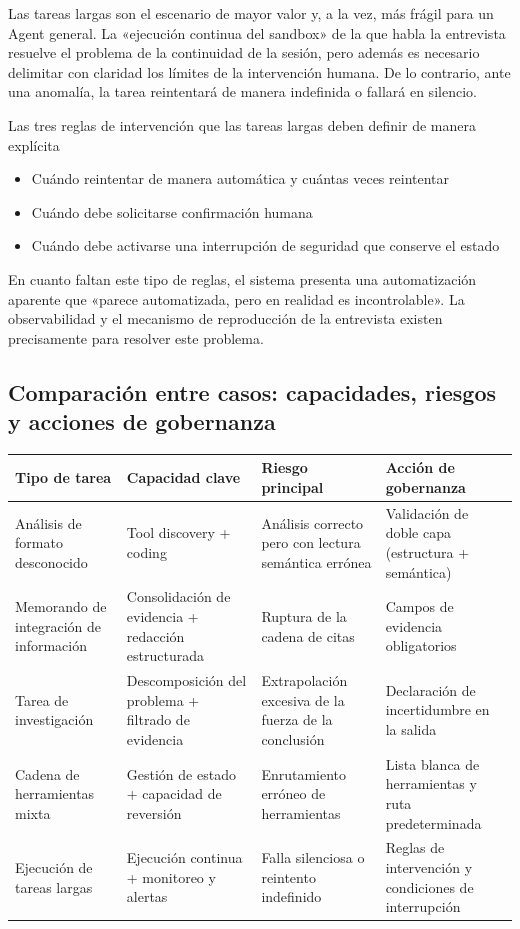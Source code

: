 \documentclass[a4paper]{article}
\begin{document}
Las tareas largas son el escenario de mayor valor y, a la vez, más frágil para un Agent general. La «ejecución continua del sandbox» de la que habla la entrevista resuelve el problema de la continuidad de la sesión, pero además es necesario delimitar con claridad los límites de la intervención humana. De lo contrario, ante una anomalía, la tarea reintentará de manera indefinida o fallará en silencio.

\begin{warningbox}{Las tres reglas de intervención que las tareas largas deben definir de manera explícita}
\begin{itemize}
    \item Cuándo reintentar de manera automática y cuántas veces reintentar
    \item Cuándo debe solicitarse confirmación humana
    \item Cuándo debe activarse una interrupción de seguridad que conserve el estado
\end{itemize}
\end{warningbox}

En cuanto faltan este tipo de reglas, el sistema presenta una automatización aparente que «parece automatizada, pero en realidad es incontrolable». La observabilidad y el mecanismo de reproducción de la entrevista existen precisamente para resolver este problema.

\subsection{Comparación entre casos: capacidades, riesgos y acciones de gobernanza}

\begin{center}
\begin{tabular}{p{3.0cm}p{3.5cm}p{4.1cm}p{3.5cm}}
\toprule
Tipo de tarea & Capacidad clave & Riesgo principal & Acción de gobernanza \\
\midrule
Análisis de formato desconocido & Tool discovery + coding & Análisis correcto pero con lectura semántica errónea & Validación de doble capa (estructura + semántica) \\
Memorando de integración de información & Consolidación de evidencia + redacción estructurada & Ruptura de la cadena de citas & Campos de evidencia obligatorios \\
Tarea de investigación & Descomposición del problema + filtrado de evidencia & Extrapolación excesiva de la fuerza de la conclusión & Declaración de incertidumbre en la salida \\
Cadena de herramientas mixta & Gestión de estado + capacidad de reversión & Enrutamiento erróneo de herramientas & Lista blanca de herramientas y ruta predeterminada \\
Ejecución de tareas largas & Ejecución continua + monitoreo y alertas & Falla silenciosa o reintento indefinido & Reglas de intervención y condiciones de interrupción \\
\bottomrule
\end{tabular}
\end{center}
\end{document}
